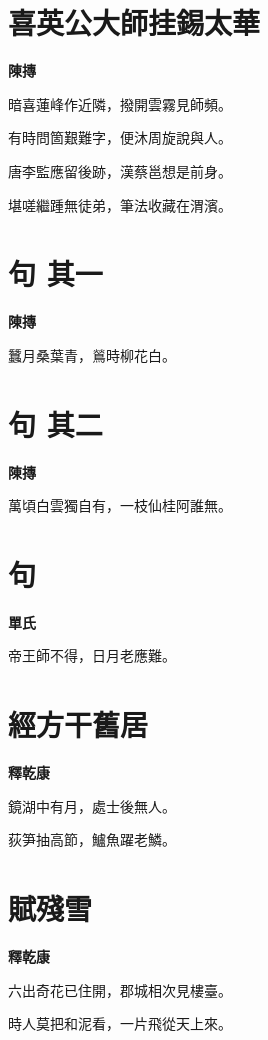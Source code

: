 \documentclass[12pt,a4paper]{ctexbook}
\begin{document}
\section{喜英公大師挂錫太華}
\textbf{陳摶}\par\vspace{0.5em}
暗喜蓮峰作近隣，撥開雲霧見師頻。\par
有時問箇艱難字，便沐周旋說與人。\par
唐李監應留後跡，漢蔡邕想是前身。\par
堪嗟繼踵無徒弟，筆法收藏在渭濱。\par

\section{句  其一}
\textbf{陳摶}\par\vspace{0.5em}
蠶月桑葉青，鶑時柳花白。\par

\section{句  其二}
\textbf{陳摶}\par\vspace{0.5em}
萬頃白雲獨自有，一枝仙桂阿誰無。\par

\section{句}
\textbf{單氏}\par\vspace{0.5em}
帝王師不得，日月老應難。\par

\section{經方干舊居}
\textbf{釋乾康}\par\vspace{0.5em}
鏡湖中有月，處士後無人。\par
荻笋抽高節，鱸魚躍老鱗。\par

\section{賦殘雪}
\textbf{釋乾康}\par\vspace{0.5em}
六出奇花已住開，郡城相次見樓臺。\par
時人莫把和泥看，一片飛從天上來。\par
\end{document}
